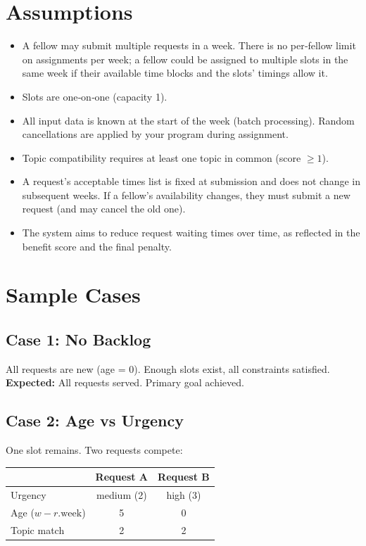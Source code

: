 \documentclass[12pt]{article}
\begin{document}
\section*{Assumptions}

\begin{itemize}
\item A fellow may submit multiple requests in a week. There is no per‑fellow limit on assignments per week; a fellow could be assigned to multiple slots in the same week if their available time blocks and the slots' timings allow it.
\item Slots are one‑on‑one (capacity 1).
\item All input data is known at the start of the week (batch processing). Random cancellations are applied by your program during assignment.
\item Topic compatibility requires at least one topic in common (score $\ge 1$).
\item A request's acceptable times list is fixed at submission and does not change in subsequent weeks. If a fellow's availability changes, they must submit a new request (and may cancel the old one).
\item The system aims to reduce request waiting times over time, as reflected in the benefit score and the final penalty.
\end{itemize}

\section*{Sample Cases}

\subsection*{Case 1: No Backlog}
All requests are new (age = 0). Enough slots exist, all constraints satisfied.  
\textbf{Expected:} All requests served. Primary goal achieved.

\subsection*{Case 2: Age vs Urgency}
One slot remains. Two requests compete:

\begin{center}
\begin{tabular}{lcc}
\toprule
& Request A & Request B \\
\midrule
Urgency & medium (2) & high (3) \\
Age ($w - r.\text{week}$) & 5 & 0 \\
Topic match & 2 & 2 \\
\bottomrule
\end{tabular}
\end{center}
\end{document}
